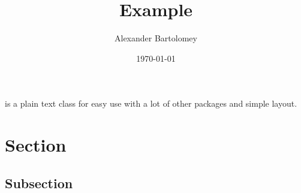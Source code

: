 \documentclass[11pt]{dtext}
\title{\dtext Example}
\author{Alexander Bartolomey}
\date{\today}
\begin{document}
\maketitle
\dtext is a plain text class for easy use with a lot of other packages
and simple layout.
\section{Section}
\lipsum[1]
\subsection{Subsection}
\lipsum[2]
\end{document}
